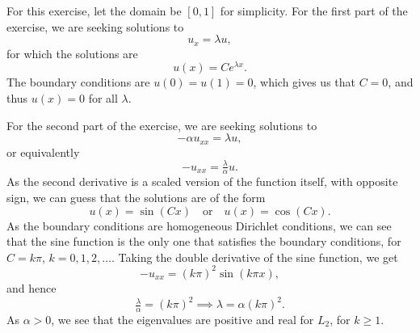 \begin{solution}{4.6}
    For this exercise, let the domain be $[0, 1]$ for simplicity.
    For the first part of the exercise, we are seeking solutions to
    \begin{equation}
        u_x = \lambda u,
    \end{equation}
    for which the solutions are
    \begin{equation}
        u(x) = C e^{\lambda x}.
    \end{equation}
    The boundary conditions are $u(0) = u(1) = 0$, which gives us that $C = 0$, and thus $u(x) = 0$ for all $\lambda$.

    For the second part of the exercise, we are seeking solutions to
    \begin{equation}
        -\alpha u_{xx} = \lambda u,
    \end{equation}
    or equivalently
    \begin{equation}
        -u_{xx} = \tfrac{\lambda}{\alpha} u.
    \end{equation}
    As the second derivative is a scaled version of the function itself, with opposite sign, we can guess that the solutions are of the form
    \begin{equation}
        u(x) = \sin(C x)
        \quad \text{or} \quad
        u(x) = \cos(C x).
    \end{equation}
    As the boundary conditions are homogeneous Dirichlet conditions, we can see that the sine function is the only one that satisfies the boundary conditions, for $C = k \pi$, $k = 0, 1, 2, \ldots$.
    Taking the double derivative of the sine function, we get
    \begin{equation}
        -u_{xx} = (k \pi)^2 \sin(k \pi x),
    \end{equation}
    and hence
    \begin{equation}
        \tfrac{\lambda}{\alpha} = (k \pi)^2 \implies \lambda = \alpha (k \pi)^2.
    \end{equation}
    As $\alpha > 0$, we see that the eigenvalues are positive and real for $L_2$, for $k \geq 1$.


\end{solution}
